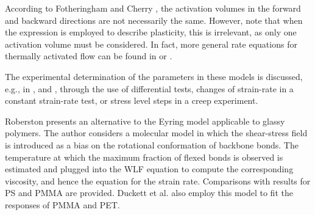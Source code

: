 According to Fotheringham and Cherry \citep{fotheringhamRoleRecoveryForces1978}, the activation volumes in the forward and backward directions are not necessarily the same.
However, note that when the expression is employed to describe plasticity, this is irrelevant, as only one activation volume must be considered.
In fact, more general rate equations for thermally activated flow can be found in \cite{brinkmanMechanicalThermodynamicalTheory1957} or \cite{kocks1975thermodynamics}.

The experimental determination of the parameters in these models is discussed, e.g., in \cite{evansThermallyActivatedDeformation1969}, \cite{conradAthermalComponentFlow1970} and \cite{kocks1975thermodynamics}, through the use of differential tests, changes of strain-rate in a constant strain-rate test, or stress level steps in a creep experiment.


Roberston \citep{robertsonTheoryPlasticityGlassy1966} presents an alternative to the Eyring model applicable to glassy polymers.
The author considers a molecular model in which the shear-stress field is introduced as a bias on the rotational conformation of backbone bonds.
The temperature at which the maximum fraction of flexed bonds is observed is estimated and plugged into the WLF equation to compute the corresponding viscosity, and hence the equation for the strain rate.
Comparisons with results for PS and PMMA are provided.
Duckett et al. \citep{duckettStrainrateTemperaturePressure1970} also employ this model to fit the responses of PMMA and PET.

